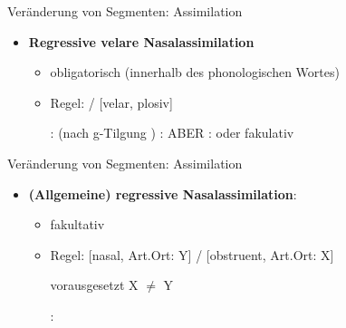
\begin{frame}{Veränderung von Segmenten: Assimilation}

\begin{itemize}
	\item \textbf{Regressive velare Nasalassimilation}

	\begin{itemize}
		\item obligatorisch (innerhalb des phonologischen Wortes)
		\item Regel:  \ras \textipa{[N]} /  \underline{\quad} [velar, plosiv]

	\eal		
		\ex {}:  \ras {} (nach g-Tilgung \ras \textipa{[fy:.{\textscr}UN]})
		\ex {}:  \ras \textipa{[ba\alertred{N}k]}
		\ex ABER :  \ras {} oder fakulativ 
	\zl
	
 	\end{itemize}
 \end{itemize}
 \end{frame}


\begin{frame}{Veränderung von Segmenten: Assimilation}
 
\begin{itemize}

	\item \textbf{(Allgemeine) regressive Nasalassimilation}:

	\begin{itemize}
		\item fakultativ
		\item Regel: [nasal, Art.Ort: Y]  /  \underline{\quad} [obstruent, Art.Ort: X]
		
		vorausgesetzt X $\neq$ Y

		\ea {}:  \ras \textipa{[fY\alertred{m}f]}
		\z
		
	\end{itemize}		

\end{itemize}

\end{frame}


